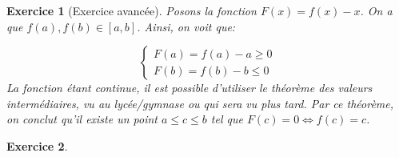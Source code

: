 \documentclass{article}
\theoremstyle{exercice}
\newtheorem{exercice}{Exercice}
\begin{document}
\begin{exercice}[Exercice avancée]
    
Posons la fonction $F(x)=f(x)-x$. On a que $f(a), f(b)\in [a,b] $. Ainsi, on voit que:

\begin{equation}
    \begin{cases}
        F(a)= f(a)-a \geq 0\\
        F(b)= f(b)-b\leq 0
    \end{cases}
\end{equation}
La fonction étant continue, il est possible d'utiliser le théorème des valeurs intermédiaires, vu au lycée/gymnase ou qui sera vu plus tard. Par ce théorème, on conclut qu'il existe un point $a\leq c\leq b$ tel que $F(c)=0\iff f(c)=c$.

\end{exercice}

\begin{exercice}
    
\end{exercice}
\end{document}

